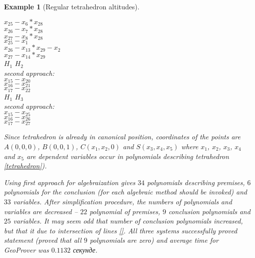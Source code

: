 \documentclass[final,1p,times,authoryear]{elsarticle}
\newtheorem{example}[theorem]{Example}
\begin{document}
\begin{example}[Regular tetrahedron altitudes]
\begin{footnotesize}
\begin{tabbing}
  $x_{25}  -  x_6*x_{28}$ \\
  $x_{26}  -  x_7*x_{28}$ \\
  $x_{27}  -  x_8*x_{28}$ \\
  $x_{25}  -  x_1$ \\
  $x_{26}  -  x_{13}*x_{29}  -  x_2$ \\
  $x_{27}  -  x_{14}*x_{29}$ \\
 $H_1$ $H_2$ \\
second approach: \\
  $x_{15}  -  x_{20}$ \\
  $x_{16}  -  x_{21}$ \\
  $x_{17}  -  x_{22}$ \\
 $H_1$ $H_3$ \\
second approach: \\
 $x_{15}  -  x_{25}$ \\
 $x_{16}  -  x_{26}$ \\
 $x_{17}  -  x_{27}$ \\
\end{tabbing}
\end{footnotesize}

Since tetrahedron is already in canonical position, coordinates of the
points are $A(0, 0, 0)$, $B(0, 0, 1)$, $C(x_1, x_2, 0)$ and
$S(x_3, x_4, x_5)$ where $x_1$, $x_2$, $x_3$, $x_4$ and $x_5$ are
dependent variables occur in polynomials describing tetrahedron
\ref{tetrahedron}).


Using first approach for algebraization gives $34$ polynomials
describing premises, $6$ polynomials for the conclusion (for each
algebraic method should be invoked) and $33$ variables. After
simplification procedure, the numbers of polynomials and variables are
decreased -- $22$ polynomial of premises, $9$ conclusion polynomials
and $25$ variables. It may seem odd that number of conclusion
polynomials increased, but that it due to intersection of lines
\ref{}. All three systems successfully proved statement (proved that
all $9$ polynomials are zero) and average time for GeoProver was
$0.1132$ секунде.


\end{example}
\end{document}
